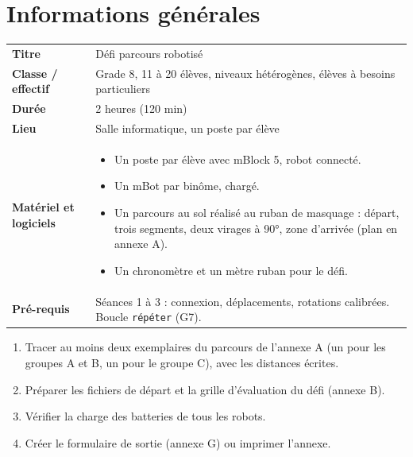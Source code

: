 \documentclass[11pt,a4paper]{article}
\begin{document}

\section{Informations générales}
\begin{tabularx}{\linewidth}{>{\bfseries}p{3.6cm}Y}
\toprule
Titre & Défi parcours robotisé\\
Classe / effectif & Grade 8, 11 à 20 élèves, niveaux hétérogènes, élèves à besoins particuliers\\
Durée & 2 heures (120 min)\\
Lieu & Salle informatique, un poste par élève\\
Matériel et logiciels &
\begin{itemize}
 \item Un poste par élève avec mBlock 5, robot connecté.
 \item Un mBot par binôme, chargé.
 \item Un parcours au sol réalisé au ruban de masquage : départ, trois segments, deux virages à 90°, zone d'arrivée (plan en annexe A).
 \item Un chronomètre et un mètre ruban pour le défi.
\end{itemize}\\
Pré-requis &
Séances 1 à 3 : connexion, déplacements, rotations calibrées. Boucle \texttt{répéter} (G7).\\
\bottomrule
\end{tabularx}

\begin{astuce}
\begin{enumerate}
 \item Tracer au moins deux exemplaires du parcours de l'annexe A (un pour les groupes A et B, un pour le groupe C), avec les distances écrites.
 \item Préparer les fichiers de départ et la grille d'évaluation du défi (annexe B).
 \item Vérifier la charge des batteries de tous les robots.
 \item Créer le formulaire de sortie (annexe G) ou imprimer l'annexe.
\end{enumerate}
\end{astuce}

\end{document}
